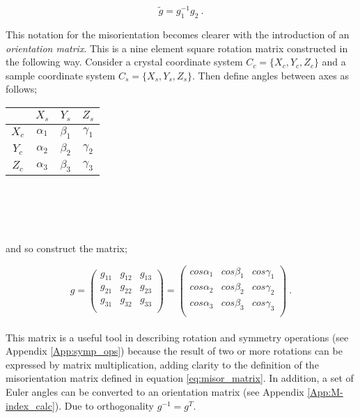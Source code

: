 \documentclass[a4paper,12pt,twoside]{report}
\numberwithin{equation}{chapter}
\begin{document}
\begin{equation} \label{eq:misor_matrix}
\tilde{g} = g_1^{-1}g_2\ .
\end{equation} 

This notation for the misorientation becomes clearer with the introduction of an \emph{orientation matrix}. This is a nine element square rotation matrix constructed in the following way. Consider a crystal coordinate system $C_c = \{X_c,Y_c,Z_c\}$ and a sample coordinate system $C_s = \{X_s,Y_s,Z_s\}$. Then define angles between axes as follows;
\begin{table}[t!]
    \centering
	\begin{tabular}{c | c c c}

	  & $X_s$      & $Y_s$      & $Z_s$ \\
\hline
$X_c$ & $\alpha_1$ & $\beta_1$ & $\gamma_1$ \\
$Y_c$ & $\alpha_2$ & $\beta_2$ & $\gamma_2$ \\
$Z_c$ & $\alpha_3$ & $\beta_3$ & $\gamma_3$ \\

	\end{tabular}
\end{table}
\\
\\
\\
\\
\noindent
and so construct the matrix;

\begin{equation}
g = 
\begin{pmatrix}
g_{11} & g_{12} & g_{13} \\
g_{21} & g_{22} & g_{23} \\
g_{31} & g_{32} & g_{33} \\
\end{pmatrix}
= 
\begin{pmatrix}
cos \alpha_1 & cos \beta_1 & cos \gamma_1 \\
cos \alpha_2 & cos \beta_2 & cos \gamma_2 \\
cos \alpha_3 & cos \beta_3 & cos \gamma_3 \\
\end{pmatrix}\ .
\end{equation}
\\
This matrix is a useful tool in describing rotation and symmetry operations (see Appendix \ref{App:symp_ops}) because the result of two or more rotations can be expressed by matrix multiplication, adding clarity to the definition of the misorientation matrix defined in equation \ref{eq:misor_matrix}. In addition, a set of Euler angles can be converted to an orientation matrix (see Appendix \ref{App:M-index_calc}). Due to orthogonality $g^{-1} = g^T$. 
\end{document}

